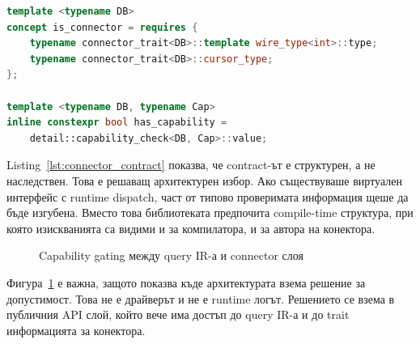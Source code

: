 \begin{lstlisting}[language=C++,caption={Извадка от формалния connector contract},label={lst:connector_contract}]
template <typename DB>
concept is_connector = requires {
    typename connector_trait<DB>::template wire_type<int>::type;
    typename connector_trait<DB>::cursor_type;
};

template <typename DB, typename Cap>
inline constexpr bool has_capability =
    detail::capability_check<DB, Cap>::value;
\end{lstlisting}

Listing~\ref{lst:connector_contract} показва, че contract-ът е структурен, а не наследствен. Това е решаващ архитектурен избор. Ако съществуваше виртуален интерфейс с runtime dispatch, част от типово проверимата информация щеше да бъде изгубена. Вместо това библиотеката предпочита compile-time структура, при която изискванията са видими и за компилатора, и за автора на конектора.

\begin{figure}[H]
\centering
{}
\caption{Capability gating между query IR-а и connector слоя}
\label{fig:capability_gating}
\end{figure}

Фигура~\ref{fig:capability_gating} е важна, защото показва къде архитектурата взема решение за допустимост. Това не е драйверът и не е runtime логът. Решението се взема в публичния API слой, който вече има достъп до query IR-а и до trait информацията за конектора.


